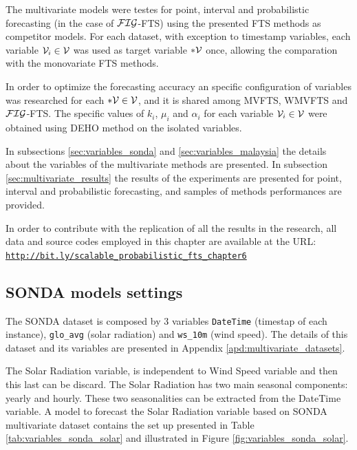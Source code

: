 The multivariate models were testes for point, interval and probabilistic forecasting (in the case of $\mathcal{FIG}$-FTS) using the presented FTS methods as competitor models. For each dataset, with exception to timestamp variables, each variable $\mathcal{V}_i \in \mathcal{V}$ was used as target variable $*\mathcal{V}$ once, allowing the comparation with the monovariate FTS methods. 

In order to optimize the forecasting accuracy an specific configuration of variables was researched for each $*\mathcal{V} \in \mathcal{V}$, and it is shared among MVFTS, WMVFTS and  $\mathcal{FIG}$-FTS. The specific values of $k_i$, $\mu_i$ and $\alpha_i$ for each variable $\mathcal{V}_i \in \mathcal{V}$ were obtained using DEHO method on the isolated variables.

In subsections \ref{sec:variables_sonda} and \ref{sec:variables_malaysia} the details about the variables of the multivariate methods are presented. In subsection \ref{sec:multivariate_results} the results of the experiments are presented for point, interval and probabilistic forecasting, and samples of methods performances are provided.

In order to contribute with the replication of all the results in the research, all data and source codes employed in this chapter are available at the URL:
\texttt{\url{http://bit.ly/scalable_probabilistic_fts_chapter6}}

\subsection{SONDA models settings}
\label{sec:variables_sonda}

The SONDA dataset is composed by 3 variables \texttt{DateTime} (timestap of each instance), \texttt{glo\_avg} (solar radiation) and \texttt{ws\_10m} (wind speed). The details of this dataset and its variables are presented in Appendix \ref{apd:multivariate_datasets}. 

The Solar Radiation variable, is independent to Wind Speed variable and then this last can be discard. The Solar Radiation has two main seasonal components: yearly and hourly. These two seasonalities can be extracted from the DateTime variable.  A model to forecast the Solar Radiation variable based on SONDA  multivariate dataset contains the set up presented in Table \ref{tab:variables_sonda_solar} and illustrated in Figure \ref{fig:variables_sonda_solar}.

